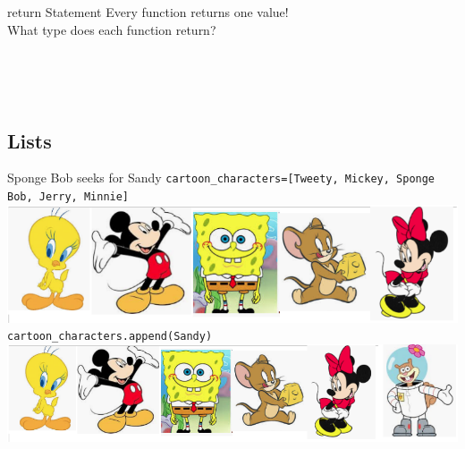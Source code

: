         \begin{frame}{return Statement}
            Every function returns one value!\\
            \pause
            What type does each function return?
            \begin{columns}
                \begin{column}{0.35\textwidth}
                    \pause
                    \inputminted[frame=single, framesep=2pt]{python3}{code-examples/return_int.py}
                \end{column}
                \begin{column}{0.6\textwidth}
                    \pause
                    \inputminted[frame=single, framesep=2pt]{python3}{code-examples/return_string.py}
                \end{column}
            \end{columns}  
        \pause
            \inputminted[frame=single, framesep=2pt]{python3}{code-examples/return_none.py}
            \pause
            \inputminted[frame=single, framesep=2pt]{python3}{code-examples/return_list.py}
        \end{frame}
    
    \subsection{Lists}
    \begin{frame}{Sponge Bob seeks for Sandy}
        \pause
        \texttt{cartoon\_characters=[\textquotesingle Tweety\textquotesingle , \textquotesingle Mickey\textquotesingle , \textquotesingle Sponge Bob\textquotesingle , \textquotesingle Jerry\textquotesingle , \textquotesingle Minnie\textquotesingle ]}\\
        \includegraphics[width=.80\textwidth]{images/list_cartoons/list0.png}   
        \pause
        \texttt{cartoon\_characters.append(\textquotesingle Sandy\textquotesingle )}\\
        \pause
        \includegraphics[width=.95\textwidth]{images/list_cartoons/list_after_append.png}       
    \end{frame}

